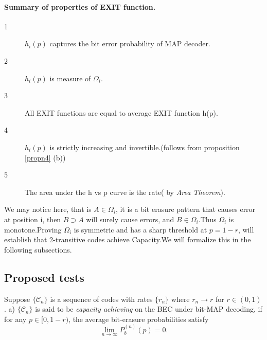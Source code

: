 \documentclass[
11pt, %
a4paper, %
oneside, %
headinclude,footinclude, %
BCOR5mm, %
]{scrartcl}
\begin{document}
\paragraph*{Summary of properties of EXIT function.}
\begin{description}
\item[1] $h_i(p)$ captures the bit error probability of MAP decoder.
\item[2] $h_i(p)$ is measure of $\Omega_i$.
\item[3] All EXIT functions are equal to average EXIT function h(p).
\item[4] $h_i(p)$ is strictly increasing and invertible.(follows from proposition \ref{propn4} (b))
\item[5] The area under the h vs p curve is the rate( by \emph{Area Theorem}).
\end{description}
We may notice here, that is $A\in\Omega_i$, it is a bit erasure pattern that causes error at position i, then $B\supset A$ will surely cause errors, and $B\in\Omega_i$.Thus $\Omega_i$ is monotone.Proving $\Omega_i $ is symmetric and has a sharp threshold at $p=1-r$, will establish that 2-transitive codes achieve Capacity.We will formalize this in the following subsections.

\subsection{Proposed tests}
\begin{definition}
Suppose $\{\mathcal{C}_n\}$ is a sequence of codes with rates $\{r_n\}$ where $r_n \to r$ for $r \in (0,1)$.
a) $\{\mathcal{C}_n\}$ is said to be \emph{capacity achieving} on the BEC under bit-MAP decoding, if for any $p \in [0, 1-r)$, the average bit-erasure probabilities satisfy $$\lim_{n \to \infty} P_b^{(n)}(p) = 0.$$

\end{definition}
\label{def10}

\end{document}
